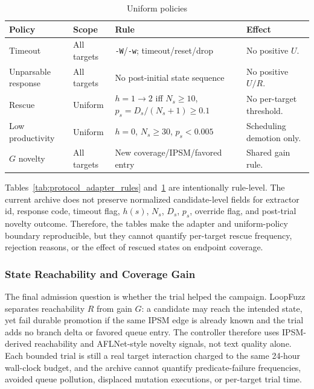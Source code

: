 \documentclass[final,5p,times,number]{elsarticle}
\begin{document}
\begin{table}[!t]
\centering
\caption{Uniform policies}
\label{tab:uniform_policies}
{\scriptsize
\setlength{\tabcolsep}{3.2pt}
\renewcommand{\arraystretch}{1.08}
\begin{tabularx}{\textwidth}{>{\raggedright\arraybackslash}p{}
>{\raggedright\arraybackslash}p{}
>{\raggedright\arraybackslash}X
>{\raggedright\arraybackslash}p{}}
\toprule
Policy & Scope & Rule & Effect \\
\midrule
Timeout &
All targets &
\texttt{-W}/\texttt{-w}; timeout/reset/drop &
No positive $U$. \\
Unparsable response &
All targets &
No post-initial state sequence &
No positive $U/R$. \\
Rescue &
Uniform &
$h=1\!\rightarrow\!2$ iff $N_s\ge10$, $p_s=D_s/(N_s+1)\ge0.1$ &
No per-target threshold. \\
Low productivity &
Uniform &
$h=0$, $N_s\ge30$, $p_s<0.005$ &
Scheduling demotion only. \\
$G$ novelty &
All targets &
New coverage/IPSM/favored entry &
Shared gain rule. \\
\bottomrule
\end{tabularx}
}
\end{table}

Tables~\ref{tab:protocol_adapter_rules} and~\ref{tab:uniform_policies} are intentionally rule-level. The current archive does not preserve normalized candidate-level fields for extractor id, response code, timeout flag, $h(s)$, $N_s$, $D_s$, $p_s$, override flag, and post-trial novelty outcome. Therefore, the tables make the adapter and uniform-policy boundary reproducible, but they cannot quantify per-target rescue frequency, rejection reasons, or the effect of rescued states on endpoint coverage.

\subsubsection{State Reachability and Coverage Gain}
The final admission question is whether the trial helped the campaign. LoopFuzz separates reachability $R$ from gain $G$: a candidate may reach the intended state, yet fail durable promotion if the same IPSM edge is already known and the trial adds no branch delta or favored queue entry. The controller therefore uses IPSM-derived reachability and AFLNet-style novelty signals, not text quality alone. Each bounded trial is still a real target interaction charged to the same 24-hour wall-clock budget, and the archive cannot quantify predicate-failure frequencies, avoided queue pollution, displaced mutation executions, or per-target trial time.
\end{document}
